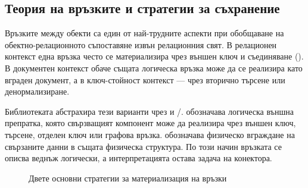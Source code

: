 \subsection{Теория на връзките и стратегии за съхранение}

Връзките между обекти са един от най-трудните аспекти при обобщаване на обектно-релационното съпоставяне извън релационния свят. В релационен контекст една връзка често се материализира чрез външен ключ и съединяване (). В документен контекст обаче същата логическа връзка може да се реализира като вграден документ, а в ключ-стойност контекст --- чрез вторично търсене или денормализиране.

Библиотеката абстрахира тези варианти чрез  и /.  обозначава логическа външна препратка, която свързващият компонент може да реализира чрез външен ключ, търсене, отделен ключ или графова връзка.  обозначава физическо вграждане на свързаните данни в същата физическа структура. По този начин връзката се описва веднъж логически, а интерпретацията остава задача на конектора.

\begin{figure}[H]
\centering
{}
\caption{Двете основни стратегии за материализация на връзки}
\label{fig:relationship_strategies}
\end{figure}

